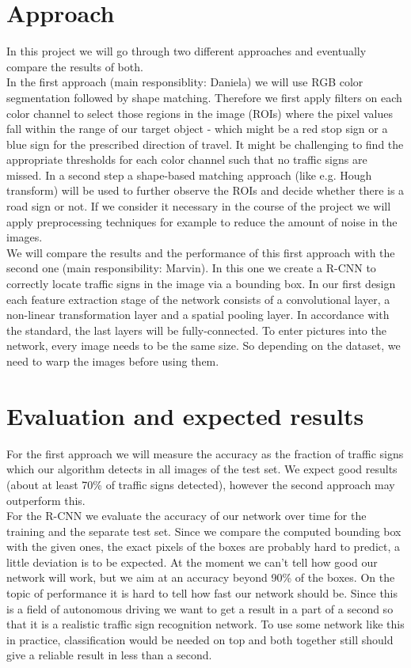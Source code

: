 \documentclass[a4paper,11pt]{scrartcl}
\begin{document}
\section*{Approach}
In this project we will go through two different approaches and eventually compare the results of both. \\
In the first approach (main responsiblity: Daniela) we will use RGB color segmentation followed by shape matching. Therefore we first apply filters on each color channel to select those regions in the image (ROIs) where the pixel values fall within the range of our target object - which might be a red stop sign or a blue sign for the prescribed direction of travel. It might be challenging to find the appropriate thresholds for each color channel such that no traffic signs are missed. In a second step a shape-based matching approach (like e.g. Hough transform) will be used to further observe the ROIs and decide whether there is a road sign or not. If we consider it necessary in the course of the project we will apply preprocessing techniques for example to reduce the amount of noise in the images. \\
We will compare the results and the performance of this first approach 
with the second one (main responsibility: Marvin). In this one we create a R-CNN to correctly locate traffic signs in the image via a bounding box. In our 
first design each feature extraction stage of the network consists of a 
convolutional layer, a non-linear transformation layer and a spatial 
pooling layer. In accordance with the standard, the last layers will be fully-connected. To enter pictures into the network, every image needs to be the same 
size. So depending on the dataset, we need to warp the images before 
using them.


\section*{Evaluation and expected results}
For the first approach we will measure the accuracy as the fraction of traffic signs which our algorithm detects in all images of the test set. We expect good results (about at least 70\% of traffic signs detected), however the second approach may outperform this. \\
For the R-CNN we evaluate the accuracy of our network over 
time for the training and the separate test set. Since we compare the 
computed bounding box with the given ones, the exact pixels of the boxes 
are probably hard to predict, a little deviation is to be expected. At 
the moment we can't tell how good our network will work, but we aim at 
an accuracy beyond 90\% of the boxes.
On the topic of performance it is hard to tell how fast our network 
should be. Since this is a field of autonomous driving we want to get a 
result in a part of a second so that it is a realistic traffic sign 
recognition network. To use some network like this in practice, classification would be needed on top and both together still should give a reliable 
result in less than a second.
\end{document}
